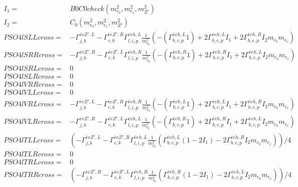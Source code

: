 \documentclass[A4,landscape]{article}
\begin{document}
\begin{align} 
I_1= & B0C0check(m^2_{e_{{b}}}, m^2_{e_{{c}}}, m^2_{{Z'}}) \\ 
I_2= & C_0(m^2_{e_{{b}}}, m^2_{e_{{c}}}, m^2_{{Z'}}) \\ 
  PSO4lSLLcross= &  - \Gamma^{\bar{e}e {Z'} ,L} _{j, b} - \Gamma^{\bar{e}e {Z'} ,R} _{c, k} \Gamma^{\bar{e}e h ,L}_{l, i, p} \frac{1}{m^2_{h_{{p}}}} (-(\Gamma^{\bar{e}e h ,L}_{b, c, p} 1) + 2 \Gamma^{\bar{e}e h ,L}_{b, c, p} I_1 + 2 \Gamma^{\bar{e}e h ,R}_{b, c, p} I_2 m_{e_{{b}}} m_{e_{{c}}}) \\ 
  PSO4lSRRcross= &  - \Gamma^{\bar{e}e {Z'} ,R} _{j, b} - \Gamma^{\bar{e}e {Z'} ,L} _{c, k} \Gamma^{\bar{e}e h ,R}_{l, i, p} \frac{1}{m^2_{h_{{p}}}} (-(\Gamma^{\bar{e}e h ,R}_{b, c, p} 1) + 2 \Gamma^{\bar{e}e h ,R}_{b, c, p} I_1 + 2 \Gamma^{\bar{e}e h ,L}_{b, c, p} I_2 m_{e_{{b}}} m_{e_{{c}}}) \\ 
  PSO4lSRLcross= & 0 \\ 
  PSO4lSLRcross= & 0 \\ 
  PSO4lVRRcross= & 0 \\ 
  PSO4lVLLcross= & 0 \\ 
  PSO4lVRLcross= &  - \Gamma^{\bar{e}e {Z'} ,L} _{j, b} - \Gamma^{\bar{e}e {Z'} ,R} _{c, k} \Gamma^{\bar{e}e h ,R}_{l, i, p} \frac{1}{m^2_{h_{{p}}}} (-(\Gamma^{\bar{e}e h ,L}_{b, c, p} 1) + 2 \Gamma^{\bar{e}e h ,L}_{b, c, p} I_1 + 2 \Gamma^{\bar{e}e h ,R}_{b, c, p} I_2 m_{e_{{b}}} m_{e_{{c}}}) \\ 
  PSO4lVLRcross= &  - \Gamma^{\bar{e}e {Z'} ,R} _{j, b} - \Gamma^{\bar{e}e {Z'} ,L} _{c, k} \Gamma^{\bar{e}e h ,L}_{l, i, p} \frac{1}{m^2_{h_{{p}}}} (-(\Gamma^{\bar{e}e h ,R}_{b, c, p} 1) + 2 \Gamma^{\bar{e}e h ,R}_{b, c, p} I_1 + 2 \Gamma^{\bar{e}e h ,L}_{b, c, p} I_2 m_{e_{{b}}} m_{e_{{c}}}) \\ 
  PSO4lTLLcross= & ( - \Gamma^{\bar{e}e {Z'} ,L} _{j, b} - \Gamma^{\bar{e}e {Z'} ,R} _{c, k} \Gamma^{\bar{e}e h ,L}_{l, i, p} \frac{1}{m^2_{h_{{p}}}} (\Gamma^{\bar{e}e h ,L}_{b, c, p} (1 - 2 I_1) - 2 \Gamma^{\bar{e}e h ,R}_{b, c, p} I_2 m_{e_{{b}}} m_{e_{{c}}}))/4 \\ 
  PSO4lTLRcross= & 0 \\ 
  PSO4lTRLcross= & 0 \\ 
  PSO4lTRRcross= & ( - \Gamma^{\bar{e}e {Z'} ,R} _{j, b} - \Gamma^{\bar{e}e {Z'} ,L} _{c, k} \Gamma^{\bar{e}e h ,R}_{l, i, p} \frac{1}{m^2_{h_{{p}}}} (\Gamma^{\bar{e}e h ,R}_{b, c, p} (1 - 2 I_1) - 2 \Gamma^{\bar{e}e h ,L}_{b, c, p} I_2 m_{e_{{b}}} m_{e_{{c}}}))/4 \\ 
\end{align} 
\end{document}
